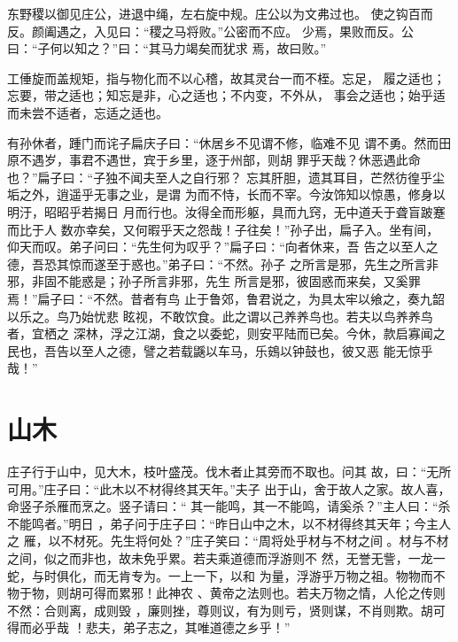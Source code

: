 \documentclass[a4paper,12pt,UTF8,twoside]{ctexbook}
\begin{document}
东野稷以御见庄公，进退中绳，左右旋中规。庄公以为文弗过也。 使之钩百而反。颜阖遇之，入见曰：“稷之马将败。”公密而不应。 少焉，果败而反。公曰：“子何以知之？”曰：“其马力竭矣而犹求 焉，故曰败。”

工倕旋而盖规矩，指与物化而不以心稽，故其灵台一而不桎。忘足， 履之适也；忘要，带之适也；知忘是非，心之适也；不内变，不外从， 事会之适也；始乎适而未尝不适者，忘适之适也。

有孙休者，踵门而诧子扁庆子曰：“休居乡不见谓不修，临难不见 谓不勇。然而田原不遇岁，事君不遇世，宾于乡里，逐于州部，则胡 罪乎天哉？休恶遇此命也？”扁子曰：“子独不闻夫至人之自行邪？ 忘其肝胆，遗其耳目，芒然彷徨乎尘垢之外，逍遥乎无事之业，是谓 为而不恃，长而不宰。今汝饰知以惊愚，修身以明汙，昭昭乎若揭日 月而行也。汝得全而形躯，具而九窍，无中道夭于聋盲跛蹇而比于人 数亦幸矣，又何暇乎天之怨哉！子往矣！”孙子出，扁子入。坐有间， 仰天而叹。弟子问曰：“先生何为叹乎？”扁子曰∶“向者休来，吾 告之以至人之德，吾恐其惊而遂至于惑也。”弟子曰：“不然。孙子 之所言是邪，先生之所言非邪，非固不能惑是；孙子所言非邪，先生 所言是邪，彼固惑而来矣，又奚罪焉！”扁子曰：“不然。昔者有鸟 止于鲁郊，鲁君说之，为具太牢以飨之，奏九韶以乐之。鸟乃始忧悲 眩视，不敢饮食。此之谓以己养养鸟也。若夫以鸟养养鸟者，宜栖之 深林，浮之江湖，食之以委蛇，则安平陆而已矣。今休，款启寡闻之 民也，吾告以至人之德，譬之若载鼷以车马，乐鴳以钟鼓也，彼又恶 能无惊乎哉！”
\section{山木}

庄子行于山中，见大木，枝叶盛茂。伐木者止其旁而不取也。问其 故，曰：“无所可用。”庄子曰：“此木以不材得终其天年。”夫子 出于山，舍于故人之家。故人喜，命竖子杀雁而烹之。竖子请曰：“ 其一能鸣，其一不能鸣，请奚杀？”主人曰：“杀不能鸣者。”明日 ，弟子问于庄子曰：“昨日山中之木，以不材得终其天年；今主人之 雁，以不材死。先生将何处？”庄子笑曰：“周将处乎材与不材之间 。材与不材之间，似之而非也，故未免乎累。若夫乘道德而浮游则不 然，无誉无訾，一龙一蛇，与时俱化，而无肯专为。一上一下，以和 为量，浮游乎万物之祖。物物而不物于物，则胡可得而累邪！此神农 、黄帝之法则也。若夫万物之情，人伦之传则不然：合则离，成则毁 ，廉则挫，尊则议，有为则亏，贤则谋，不肖则欺。胡可得而必乎哉 ！悲夫，弟子志之，其唯道德之乡乎！”
\end{document}
